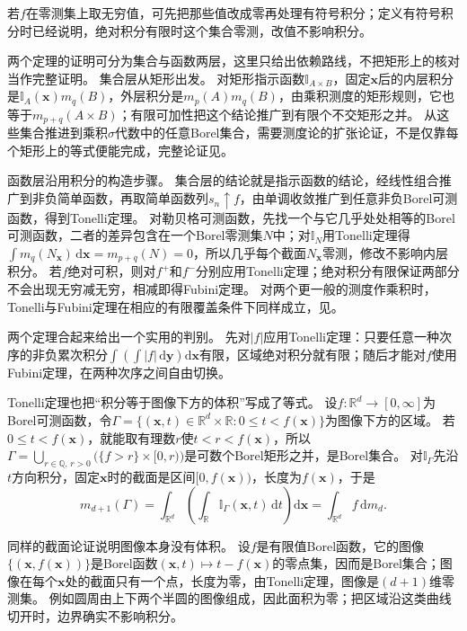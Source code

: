 若$f$在零测集上取无穷值，可先把那些值改成零再处理有符号积分；定义有符号积分时已经说明，绝对积分有限时这个集合零测，改值不影响积分。

两个定理的证明可分为集合与函数两层，这里只给出依赖路线，不把矩形上的核对当作完整证明。
集合层从矩形出发。
对矩形指示函数$\mathbb I_{A\times B}$，固定$\bm x$后的内层积分是$\mathbb I_A(\bm x)m_q(B)$，外层积分是$m_p(A)m_q(B)$，由乘积测度的矩形规则，它也等于$m_{p+q}(A\times B)$；有限可加性把这个结论推广到有限个不交矩形之并。
从这些集合推进到乘积$\sigma$代数中的任意Borel集合，需要测度论的扩张论证，不是仅靠每个矩形上的等式便能完成，完整论证见。

函数层沿用积分的构造步骤。
集合层的结论就是指示函数的结论，经线性组合推广到非负简单函数，再取简单函数列$s_n\uparrow f$，由单调收敛推广到任意非负Borel可测函数，得到Tonelli定理。
对勒贝格可测函数，先找一个与它几乎处处相等的Borel可测函数，二者的差异包含在一个Borel零测集$N$中；对$\mathbb I_N$用Tonelli定理得$\int m_q(N_{\bm x})\,\mathrm d\bm x=m_{p+q}(N)=0$，所以几乎每个截面$N_{\bm x}$零测，修改不影响内层积分。
若$f$绝对可积，则对$f^+$和$f^-$分别应用Tonelli定理；绝对积分有限保证两部分不会出现无穷减无穷，相减即得Fubini定理。
对两个更一般的测度作乘积时，Tonelli与Fubini定理在相应的有限覆盖条件下同样成立，见。

两个定理合起来给出一个实用的判别。
先对$|f|$应用Tonelli定理：只要任意一种次序的非负累次积分$\int\left(\int|f|\,\mathrm d\bm y\right)\mathrm d\bm x$有限，区域绝对积分就有限；随后才能对$f$使用Fubini定理，在两种次序之间自由切换。

Tonelli定理也把“积分等于图像下方的体积”写成了等式。
设$f:\mathbb R^d\to[0,\infty]$为Borel可测函数，令$\Gamma=\{(\bm x,t)\in\mathbb R^d\times\mathbb R:0\leq t<f(\bm x)\}$为图像下方的区域。
若$0\leq t<f(\bm x)$，就能取有理数$r$使$t<r<f(\bm x)$，所以
$\Gamma=\bigcup_{r\in\mathbb Q,\,r>0}\bigl(\{f>r\}\times[0,r)\bigr)$是可数个Borel矩形之并，是Borel集合。
对$\mathbb I_\Gamma$先沿$t$方向积分，固定$\bm x$时的截面是区间$[0,f(\bm x))$，长度为$f(\bm x)$，于是
\[
 m_{d+1}(\Gamma)=\int_{\mathbb R^d}\left(\int_{\mathbb R}\mathbb I_\Gamma(\bm x,t)\,\mathrm dt\right)\mathrm d\bm x=\int_{\mathbb R^d}f\,\mathrm dm_d.
\]

同样的截面论证说明图像本身没有体积。
设$f$是有限值Borel函数，它的图像$\{(\bm x,f(\bm x))\}$是Borel函数$(\bm x,t)\mapsto t-f(\bm x)$的零点集，因而是Borel集合；图像在每个$\bm x$处的截面只有一个点，长度为零，由Tonelli定理，图像是$(d+1)$维零测集。
例如圆周由上下两个半圆的图像组成，因此面积为零；把区域沿这类曲线切开时，边界确实不影响积分。

